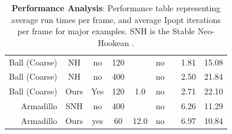 \begin{table}[]
\begin{tabular}{@{}rcccccccc@{}}
		Ball (Coarse) & NH & no & 120 & & no & & 1.81 & 15.08 \\
		Ball (Coarse) & NH & no & 400 & & no & & 2.50 & 21.84 \\
		Ball (Coarse) & Ours & Yes & 120 & 1.0 & no & & 2.71 & 22.10 \\
		\midrule
		Armadillo & SNH & no & 400 & & no & & 6.26 & 11.29 \\
		Armadillo & Ours & yes & 60 & 12.0 & no & & 6.97 & 10.84 \\
		\bottomrule
	\end{tabular}%
	\caption{\textbf{Performance Analysis}: Performance table representing average run times per frame, and
		average Ipopt iterations per frame for major examples. SNH is the Stable Neo-Hookean
		\cite{Smith:2018}.}
	\label{tab:performance}
\end{table}

